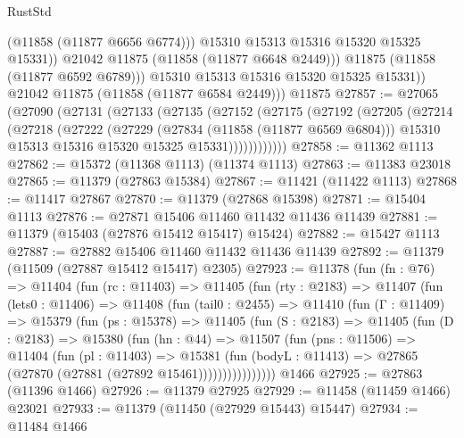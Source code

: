 \begin{lexlean}{RustStd}
\begin{coremodule}
                    (@11858 (@11877 @6656 @6774)))
                  @15310
                  @15313
                  @15316
                  @15320
                  @15325
                  @15331))
              @21042
              @11875
              (@11858 (@11877 @6648 @2449)))
            @11875
            (@11858 (@11877 @6592 @6789)))
          @15310
          @15313
          @15316
          @15320
          @15325
          @15331))
      @21042
      @11875
      (@11858 (@11877 @6584 @2449)))
    @11875
@27857 := @27065
    (@27090
      (@27131
        (@27133
          (@27135
            (@27152
              (@27175
                (@27192
                  (@27205
                    (@27214
                      (@27218
                        (@27222
                          (@27229
                            (@27834 (@11858 (@11877 @6569 @6804)))
                            @15310
                            @15313
                            @15316
                            @15320
                            @15325
                            @15331))))))))))))
@27858 := @11362 @1113
@27862 := @15372 (@11368 @1113) (@11374 @1113)
@27863 := @11383 @23018
@27865 := @11379 (@27863 @15384)
@27867 := @11421 (@11422 @1113)
@27868 := @11417 @27867
@27870 := @11379 (@27868 @15398)
@27871 := @15404 @1113
@27876 := @27871 @15406 @11460 @11432 @11436 @11439
@27881 := @11379 (@15403 (@27876 @15412 @15417) @15424)
@27882 := @15427 @1113
@27887 := @27882 @15406 @11460 @11432 @11436 @11439
@27892 := @11379 (@11509 (@27887 @15412 @15417) @2305)
@27923 := @11378
    (fun (fn : @76) =>
    @11404
      (fun (rc : @11403) =>
      @11405
        (fun (rty : @2183) =>
        @11407
          (fun (lets0 : @11406) =>
          @11408
            (fun (tail0 : @2455) =>
            @11410
              (fun (Γ : @11409) =>
              @15379
                (fun (ps : @15378) =>
                @11405
                  (fun (S : @2183) =>
                  @11405
                    (fun (D : @2183) =>
                    @15380
                      (fun (hn : @44) =>
                      @11507
                        (fun (pns : @11506) =>
                        @11404
                          (fun (pl : @11403) =>
                          @15381
                            (fun (bodyL : @11413) =>
                            @27865 (@27870 (@27881 (@27892 @15461))))))))))))))))
    @1466
@27925 := @27863 (@11396 @1466)
@27926 := @11379 @27925
@27929 := @11458 (@11459 @1466) @23021
@27933 := @11379 (@11450 (@27929 @15443) @15447)
@27934 := @11484 @1466

\end{coremodule}
\end{lexlean}
